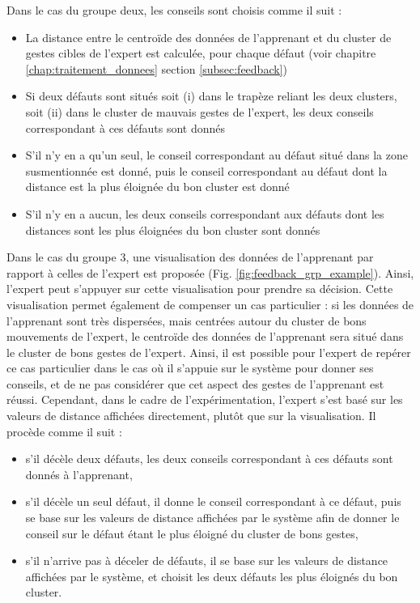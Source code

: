 Dans le cas du groupe deux, les conseils sont choisis comme il suit :
\begin{itemize}
	\item La distance entre le centroïde des données de l'apprenant et du cluster de gestes cibles de l'expert est calculée, pour chaque défaut (voir chapitre \ref{chap:traitement_donnees} section \ref{subsec:feedback})
	\item Si deux défauts sont situés soit (i) dans le trapèze reliant les deux clusters, soit (ii) dans le cluster de mauvais gestes de l'expert, les deux conseils correspondant à ces défauts sont donnés
	\item S'il n'y en a qu'un seul, le conseil correspondant au défaut situé dans la zone susmentionnée est donné, puis le conseil correspondant au défaut dont la distance est la plus éloignée du bon cluster est donné
	\item S'il n'y en a aucun, les deux conseils correspondant aux défauts dont les distances sont les plus éloignées du bon cluster sont donnés
\end{itemize}

Dans le cas du groupe 3, une visualisation des données de l'apprenant par rapport à celles de l'expert est proposée (Fig. \ref{fig:feedback_grp_example}). Ainsi, l'expert peut s'appuyer sur cette visualisation pour prendre sa décision. Cette visualisation permet également de compenser un cas particulier : si les données de l'apprenant sont très dispersées, mais centrées autour du cluster de bons mouvements de l'expert, le centroïde des données de l'apprenant sera situé dans le cluster de bons gestes de l'expert. Ainsi, il est possible pour l'expert de repérer ce cas particulier dans le cas où il s'appuie sur le système pour donner ses conseils, et de ne pas considérer que cet aspect des gestes de l'apprenant est réussi. Cependant, dans le cadre de l'expérimentation, l'expert s'est basé sur les valeurs de distance affichées directement, plutôt que sur la visualisation. Il procède comme il suit :
\begin{itemize}
	\item s'il décèle deux défauts, les deux conseils correspondant à ces défauts sont donnés à l'apprenant,
	\item s'il décèle un seul défaut, il donne le conseil correspondant à ce défaut, puis se base sur les valeurs de distance affichées par le système afin de donner le conseil sur le défaut étant le plus éloigné du cluster de bons gestes,
	\item s'il n'arrive pas à déceler de défauts, il se base sur les valeurs de distance affichées par le système, et choisit les deux défauts les plus éloignés du bon cluster.
\end{itemize}


